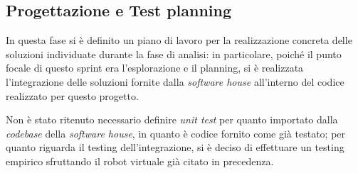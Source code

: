 



% 

% 

% 

\subsection{Progettazione e Test planning}

In questa fase si è definito un piano di lavoro per la realizzazione concreta delle soluzioni individuate durante la fase di analisi:
in particolare, poiché il punto focale di questo sprint era l'esplorazione e il planning, si è realizzata l'integrazione delle soluzioni fornite dalla \textit{software house} all'interno del codice realizzato per questo progetto.

Non è stato ritenuto necessario definire \textit{unit test} per quanto importato dalla \textit{codebase} della \textit{software house}, in quanto è codice fornito come già testato;
per quanto riguarda il testing dell'integrazione, si è deciso di effettuare un testing empirico sfruttando il robot virtuale già citato in precedenza.
